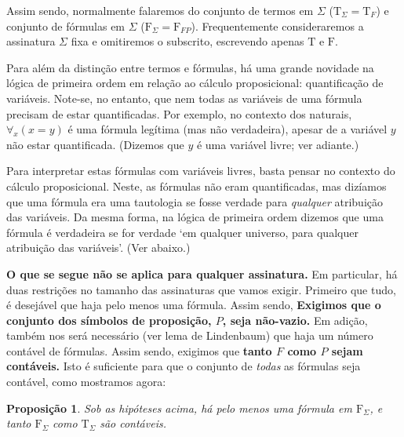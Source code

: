 \documentclass{report}
\newtheorem{prop}{Proposição}
\theoremstyle{definition}
\theoremstyle{remark}
\newcommand{\F}{\mathrm{F}}
\newcommand{\T}{\mathrm{T}}
\begin{document}
	Assim sendo, normalmente falaremos do conjunto de termos em $\Sigma$ ($\T_\Sigma = \T_F$) e conjunto de fórmulas em $\Sigma$ ($\F_\Sigma = \F_{FP}$). Frequentemente consideraremos a assinatura $\Sigma$ fixa e omitiremos o subscrito, escrevendo apenas $\T$ e $\F$.
	
	Para além da distinção entre termos e fórmulas, há uma grande novidade na lógica de primeira ordem em relação ao cálculo proposicional: quantificação de variáveis. Note-se, no entanto, que nem todas as variáveis de uma fórmula precisam de estar quantificadas. Por exemplo, no contexto dos naturais, $\forall_x (x = y)$ é uma fórmula legítima (mas não verdadeira), apesar de a variável $y$ não estar quantificada. (Dizemos que $y$ é uma variável livre; ver adiante.)
	
	Para interpretar estas fórmulas com variáveis livres, basta pensar no contexto do cálculo proposicional. Neste, as fórmulas não eram quantificadas, mas dizíamos que uma fórmula era uma tautologia se fosse verdade para \emph{qualquer} atribuição das variáveis. Da mesma forma, na lógica de primeira ordem dizemos que uma fórmula é verdadeira se for verdade `em qualquer universo, para qualquer atribuição das variáveis'. (Ver abaixo.)
	
	\textbf{O que se segue não se aplica para qualquer assinatura.} Em particular, há duas restrições no tamanho das assinaturas que vamos exigir. Primeiro que tudo, é desejável que haja pelo menos uma fórmula. Assim sendo, \textbf{Exigimos que o conjunto dos símbolos de proposição, $P$, seja não-vazio.} Em adição, também nos será necessário (ver lema de Lindenbaum) que haja um número contável de fórmulas. Assim sendo, exigimos que \textbf{tanto $F$ como $P$ sejam contáveis.} Isto é suficiente para que o conjunto de \emph{todas} as fórmulas seja contável, como mostramos agora:
	
	\begin{prop}\label{fol:size}
	Sob as hipóteses acima, há pelo menos uma fórmula em $\F_\Sigma$, e tanto $\F_\Sigma$ como $\T_\Sigma$ são contáveis.
	\end{prop}
	
\end{document}
